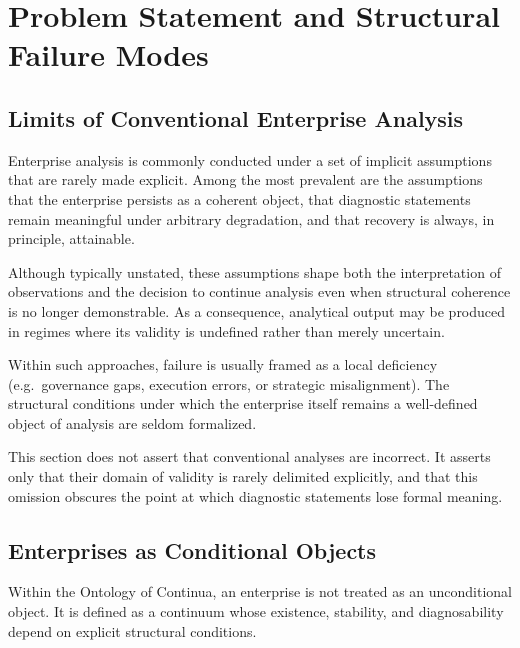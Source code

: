 
\section{Problem Statement and Structural Failure Modes}

\subsection{Limits of Conventional Enterprise Analysis}

Enterprise analysis is commonly conducted under a set of implicit
assumptions that are rarely made explicit.
Among the most prevalent are the assumptions that the enterprise
persists as a coherent object, that diagnostic statements remain
meaningful under arbitrary degradation, and that recovery is always, in
principle, attainable.

Although typically unstated, these assumptions shape both the
interpretation of observations and the decision to continue analysis
even when structural coherence is no longer demonstrable.
As a consequence, analytical output may be produced in regimes where
its validity is undefined rather than merely uncertain.

Within such approaches, failure is usually framed as a local deficiency
(e.g.\ governance gaps, execution errors, or strategic misalignment).
The structural conditions under which the enterprise itself remains a
well-defined object of analysis are seldom formalized.

This section does not assert that conventional analyses are incorrect.
It asserts only that their domain of validity is rarely delimited
explicitly, and that this omission obscures the point at which
diagnostic statements lose formal meaning.

\subsection{Enterprises as Conditional Objects}

Within the Ontology of Continua, an enterprise is not treated as an
unconditional object.
It is defined as a continuum whose existence, stability, and
diagnosability depend on explicit structural conditions.

